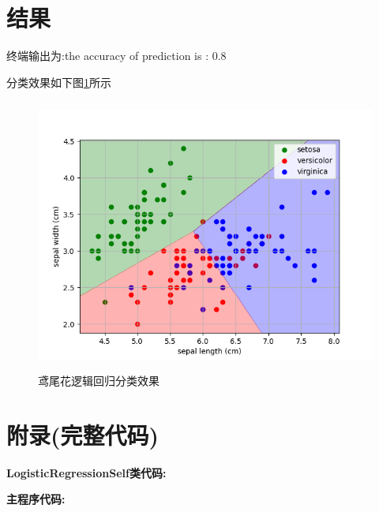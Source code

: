 \documentclass[UTF8]{article}
\begin{document}
\section{结果}
终端输出为:the accuracy of prediction is : 0.8
\par
分类效果如下图\ref{1}所示
\begin{figure}[htbp]
	\centering
	\includegraphics[width=12.0cm,height=9.0cm]{picture/鸢尾花分类.png}
	\caption{鸢尾花逻辑回归分类效果}
	\label{1}
\end{figure}

\section{附录(完整代码)}
\noindent \textbf{LogisticRegressionSelf类代码:}

\textbf{主程序代码:}

\end{document}
